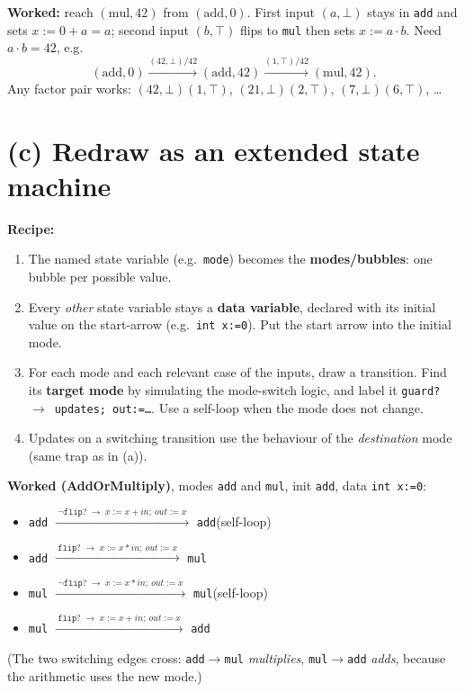 \textbf{Worked:} reach $(\mathrm{mul},42)$ from $(\mathrm{add},0)$.
First input $(a,\bot)$ stays in \texttt{add} and sets $x:=0+a=a$; second input
$(b,\top)$ flips to \texttt{mul} then sets $x:=a\cdot b$. Need $a\cdot b=42$, e.g.
\[
(\mathrm{add},0)\xrightarrow{(42,\bot)/42}(\mathrm{add},42)
\xrightarrow{(1,\top)/42}(\mathrm{mul},42).
\]
Any factor pair works: $(42,\bot)(1,\top)$, $(21,\bot)(2,\top)$, $(7,\bot)(6,\top)$, \dots

\section{(c) Redraw as an extended state machine}

\textbf{Recipe:}
\begin{enumerate}
  \item The named state variable (e.g.\ \texttt{mode}) becomes the
        \textbf{modes/bubbles}: one bubble per possible value.
  \item Every \emph{other} state variable stays a \textbf{data variable},
        declared with its initial value on the start-arrow
        (e.g.\ \texttt{int x:=0}). Put the start arrow into the initial mode.
  \item For each mode and each relevant case of the inputs, draw a transition.
        Find its \textbf{target mode} by simulating the mode-switch logic, and label it
        \texttt{guard? $\to$ updates; out:=\dots}.
        Use a self-loop when the mode does not change.
  \item Updates on a switching transition use the behaviour of the
        \emph{destination} mode (same trap as in (a)).
\end{enumerate}

\textbf{Worked (AddOrMultiply)}, modes \texttt{add} and \texttt{mul}, init \texttt{add},
data \texttt{int x:=0}:
\begin{itemize}
  \item \texttt{add} $\xrightarrow{\;\neg\texttt{flip?}\;\to\;x:=x+in;\ out:=x\;}$ \texttt{add}\quad(self-loop)
  \item \texttt{add} $\xrightarrow{\;\texttt{flip?}\;\to\;x:=x*in;\ out:=x\;}$ \texttt{mul}
  \item \texttt{mul} $\xrightarrow{\;\neg\texttt{flip?}\;\to\;x:=x*in;\ out:=x\;}$ \texttt{mul}\quad(self-loop)
  \item \texttt{mul} $\xrightarrow{\;\texttt{flip?}\;\to\;x:=x+in;\ out:=x\;}$ \texttt{add}
\end{itemize}
(The two switching edges cross: \texttt{add}$\to$\texttt{mul} \emph{multiplies},
\texttt{mul}$\to$\texttt{add} \emph{adds}, because the arithmetic uses the new mode.)

